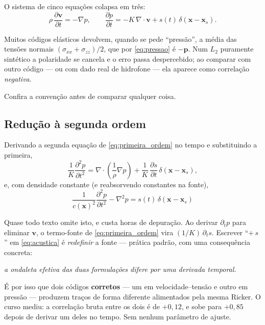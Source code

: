 \documentclass[11pt,a4paper,oneside]{report}
\begin{document}
O sistema de cinco equa\c{c}\~oes colapsa em tr\^es:
\begin{equation}
\rho\,\frac{\partial \mathbf{v}}{\partial t} = -\nabla p,
\qquad
\frac{\partial p}{\partial t} = -K\,\nabla\!\cdot\!\mathbf{v}
 + s(t)\,\delta(\mathbf{x}-\mathbf{x}_s).
\label{eq:primeira_ordem}
\end{equation}

\begin{armadilha}
Muitos c\'odigos el\'asticos devolvem, quando se pede ``press\~ao'', a
m\'edia das tens\~oes normais $(\sigma_{xx}+\sigma_{zz})/2$, que por
\eqref{eq:pressao} \'e $\mathbf{-p}$. Num $L_2$ puramente sint\'etico a
polaridade se cancela e o erro passa despercebido; ao comparar com outro
c\'odigo --- ou com dado real de hidrofone --- ela aparece como
correla\c{c}\~ao \emph{negativa}.

Confira a conven\c{c}\~ao antes de comparar qualquer coisa.
\end{armadilha}

\subsection*{Redu\c{c}\~ao \`a segunda ordem}

Derivando a segunda equa\c{c}\~ao de \eqref{eq:primeira_ordem} no tempo e
substituindo a primeira,
\begin{equation}
\frac{1}{K}\frac{\partial^{2} p}{\partial t^{2}}
 = \nabla\!\cdot\!\left(\frac{1}{\rho}\nabla p\right)
   + \frac{1}{K}\,\frac{\partial s}{\partial t}\,\delta(\mathbf{x}-\mathbf{x}_s),
\label{eq:acustica_rho}
\end{equation}
e, com densidade constante (e reabsorvendo constantes na fonte),
\begin{equation}
\boxed{\;
\frac{1}{c(\mathbf{x})^{2}}\frac{\partial^{2} p}{\partial t^{2}}
 - \nabla^{2} p = s(t)\,\delta(\mathbf{x}-\mathbf{x}_s)\;}
\label{eq:acustica}
\end{equation}

\begin{armadilha}
Quase todo texto omite isto, e custa horas de depura\c{c}\~ao. Ao derivar
$\partial_t p$ para eliminar $\mathbf{v}$, o termo-fonte de
\eqref{eq:primeira_ordem} vira $(1/K)\,\partial_t s$. Escrever
``$+\,s$'' em \eqref{eq:acustica} \'e \emph{redefinir} a fonte --- pr\'atica
padr\~ao, com uma consequ\^encia concreta:

\begin{center}
\emph{a ondaleta efetiva das duas formula\c{c}\~oes difere por uma derivada
temporal.}
\end{center}

\'E por isso que dois c\'odigos \textbf{corretos} --- um em
velocidade--tens\~ao e outro em press\~ao --- produzem tra\c{c}os de forma
diferente alimentados pela mesma Ricker. O curso mediu: a correla\c{c}\~ao
bruta entre os dois \'e de $+0{,}12$, e sobe para $+0{,}85$ depois de derivar
um deles no tempo. Sem nenhum par\^ametro de ajuste.
\end{armadilha}
\end{document}
